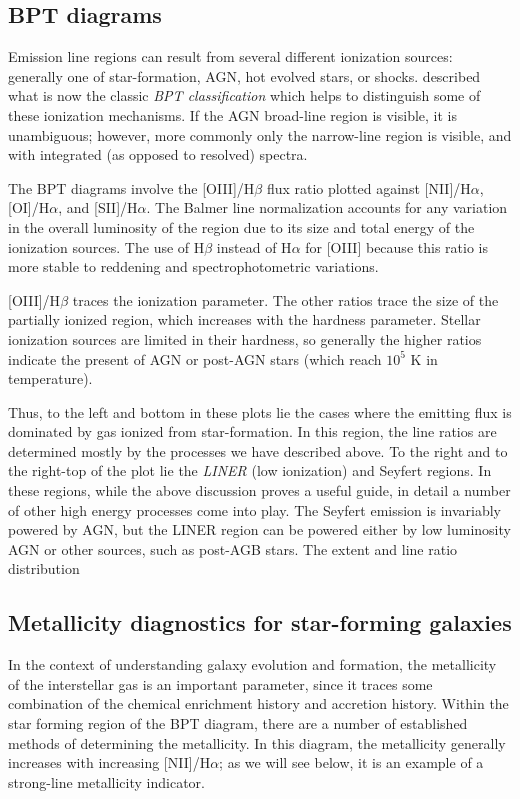 \subsection{BPT diagrams}

Emission line regions can result from several different ionization
sources: generally one of star-formation, AGN, hot evolved stars, or
shocks. \citet{baldwin81a} described what is now the classic {\it BPT
classification} which helps to distinguish some of these ionization
mechanisms. If the AGN broad-line region is visible, it is
unambiguous; however, more commonly only the narrow-line region is
visible, and with integrated (as opposed to resolved) spectra.

The BPT diagrams involve the [OIII]/H$\beta$ flux ratio plotted
against [NII]/H$\alpha$, [OI]/H$\alpha$, and [SII]/H$\alpha$. The
Balmer line normalization accounts for any variation in the overall
luminosity of the region due to its size and total energy of the
ionization sources. The use of H$\beta$ instead of H$\alpha$ for
[OIII] because this ratio is more stable to reddening and
spectrophotometric variations.

[OIII]/H$\beta$ traces the ionization parameter. The other ratios
trace the size of the partially ionized region, which increases with
the hardness parameter. Stellar ionization sources are limited in
their hardness, so generally the higher ratios indicate the present of
AGN or post-AGN stars (which reach $10^5$ K in temperature).

Thus, to the left and bottom in these plots lie the cases where the
emitting flux is dominated by gas ionized from star-formation. In this
region, the line ratios are determined mostly by the processes we have
described above. To the right and to the right-top of the plot lie the
{\it LINER} (low ionization) and Seyfert regions. In these regions,
while the above discussion proves a useful guide, in detail a number
of other high energy processes come into play. The Seyfert emission is
invariably powered by AGN, but the LINER region can be powered either
by low luminosity AGN or other sources, such as post-AGB stars. The
extent and line ratio distribution

\subsection{Metallicity diagnostics for star-forming galaxies}

In the context of understanding galaxy evolution and formation, the
metallicity of the interstellar gas is an important parameter, since
it traces some combination of the chemical enrichment history and
accretion history.  Within the star forming region of the BPT diagram,
there are a number of established methods of determining the
metallicity. In this diagram, the metallicity generally increases with
increasing [NII]/H$\alpha$; as we will see below, it is an example of
a strong-line metallicity indicator.

